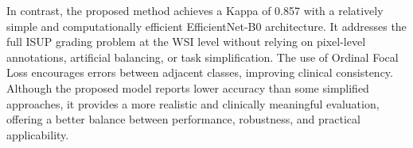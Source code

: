 In contrast, the proposed method achieves a Kappa of 0.857 with a relatively simple and computationally efficient EfficientNet-B0 architecture. It addresses the full ISUP grading problem at the WSI level without relying on pixel-level annotations, artificial balancing, or task simplification. The use of Ordinal Focal Loss encourages errors between adjacent classes, improving clinical consistency. Although the proposed model reports lower accuracy than some simplified approaches, it provides a more realistic and clinically meaningful evaluation, offering a better balance between performance, robustness, and practical applicability.

\begin{table}[htb]
	\centering
	\scriptsize
	\setlength{\tabcolsep}{3pt}
	\renewcommand{\arraystretch}{1.0}
	
\end{table}
